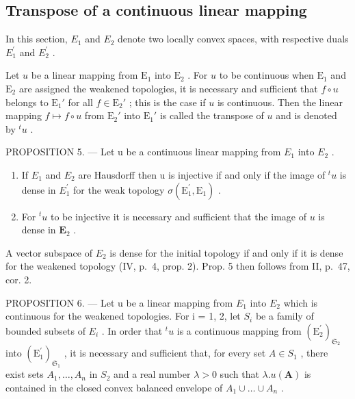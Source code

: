 \subsection{Transpose of a continuous linear mapping}

In this section, \(E_{1}\) and \(E_{2}\) denote two locally convex spaces, with respective duals \(E_{1}^{\prime}\) and \(E_{2}^{\prime}\) .

Let \(u\) be a linear mapping from \(\mathrm{E}_1\) into \(\mathrm{E}_2\) . For \(u\) to be continuous when \(\mathrm{E}_1\) and \(\mathrm{E}_2\) are assigned the weakened topologies, it is necessary and sufficient that \(f \circ u\) belongs to \(\mathrm{E}_1'\) for all \(f \in \mathrm{E}_2'\) ; this is the case if \(u\) is continuous. Then the linear mapping \(f \mapsto f \circ u\) from \(\mathrm{E}_2'\) into \(\mathrm{E}_1'\) is called the transpose of \(u\) and is denoted by \(^t u\) .

PROPOSITION 5. --- Let u be a continuous linear mapping from \(E_{1}\) into \(E_{2}\) .

\begin{enumerate}
\def\labelenumi{(\roman{enumi})}
\item
  If \(E_{1}\) and \(E_{2}\) are Hausdorff then u is injective if and only if the image of \(^{t}u\) is dense in \(E_{1}^{\prime}\) for the weak topology \(\sigma(\mathrm{E}_{1}^{\prime},\mathrm{E}_{1})\) .
\item
  For \({}^{t}u\) to be injective it is necessary and sufficient that the image of \(u\) is dense in \(\mathbf{E}_2\) .
\end{enumerate}

A vector subspace of \(E_{2}\) is dense for the initial topology if and only if it is dense for the weakened topology (IV, p.~4, prop. 2). Prop. 5 then follows from II, p.~47, cor. 2.

PROPOSITION 6. --- Let u be a linear mapping from \(E_{1}\) into \(E_{2}\) which is continuous for the weakened topologies. For i = 1, 2, let \(S_{i}\) be a family of bounded subsets of \(E_{i}\) . In order that \(^{t}u\) is a continuous mapping from \((\mathrm{E}_{2}^{\prime})_{\mathfrak{S}_{2}}\) into \((\mathrm{E}_{1}^{\prime})_{\mathfrak{S}_{1}}\) , it is necessary and sufficient that, for every set \(A \in S_{1}\) , there exist sets \(A_{1}, \ldots, A_{n}\) in \(S_{2}\) and a real number \(\lambda > 0\) such that \(\lambda.u(\mathbf{A})\) is contained in the closed convex balanced envelope of \(A_{1} \cup \ldots \cup A_{n}\) .


